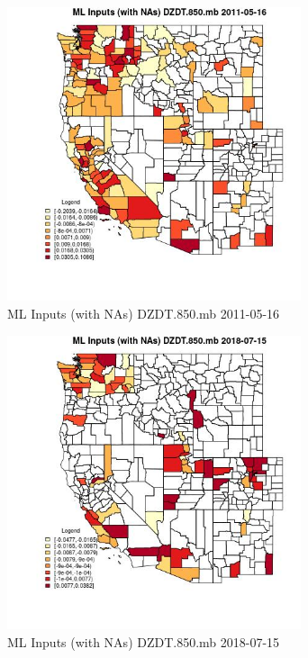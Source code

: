 \begin{figure} 
\centering  
\includegraphics[width=0.77\textwidth]{Code_Outputs/Report_ML_input_PM25_Step4_part_e_de_duplicated_aves_compiled_2019-05-21wNAs_CountyDZDT850mbMean2011-05-16.jpg} 
\caption{\label{fig:Report_ML_input_PM25_Step4_part_e_de_duplicated_aves_compiled_2019-05-21wNAsCountyDZDT850mbMean2011-05-16}ML Inputs (with NAs) DZDT.850.mb 2011-05-16} 
\end{figure} 
 

\begin{figure} 
\centering  
\includegraphics[width=0.77\textwidth]{Code_Outputs/Report_ML_input_PM25_Step4_part_e_de_duplicated_aves_compiled_2019-05-21wNAs_CountyDZDT850mbMean2018-07-15.jpg} 
\caption{\label{fig:Report_ML_input_PM25_Step4_part_e_de_duplicated_aves_compiled_2019-05-21wNAsCountyDZDT850mbMean2018-07-15}ML Inputs (with NAs) DZDT.850.mb 2018-07-15} 
\end{figure} 
 

